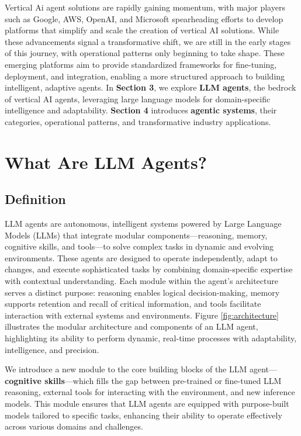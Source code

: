 \documentclass[12pt]{article}
\begin{document}
Vertical Ai agent solutions are rapidly gaining momentum, with major players such as Google, AWS, OpenAI, and Microsoft spearheading efforts to develop platforms that simplify and scale the creation of vertical AI solutions. While these advancements signal a transformative shift, we are still in the early stages of this journey, with operational patterns only beginning to take shape. These emerging platforms aim to provide standardized frameworks for fine-tuning, deployment, and integration, enabling a more structured approach to building intelligent, adaptive agents. In \textbf{Section 3}, we explore \textbf{LLM agents}, the bedrock of vertical AI agents, leveraging large language models for domain-specific intelligence and adaptability. \textbf{Section 4} introduces \textbf{agentic systems}, their categories, operational patterns, and transformative industry applications.


\section{What Are LLM Agents?}
\subsection{Definition}
LLM agents are autonomous, intelligent systems powered by Large Language Models (LLMs) that integrate modular components—reasoning, memory, cognitive skills, and tools—to solve complex tasks in dynamic and evolving environments. These agents are designed to operate independently, adapt to changes, and execute sophisticated tasks by combining domain-specific expertise with contextual understanding. 
Each module within the agent's architecture serves a distinct purpose: reasoning enables logical decision-making, memory supports retention and recall of critical information, and tools facilitate interaction with external systems and environments. Figure \ref{fig:architecture} illustrates the modular architecture and components of an LLM agent, highlighting its ability to perform dynamic, real-time processes with adaptability, intelligence, and precision.

We introduce a new module to the core building blocks of the LLM agent—\textbf{cognitive skills}—which fills the gap between pre-trained or fine-tuned LLM reasoning, external tools for interacting with the environment, and new inference models. This module ensures that LLM agents are equipped with purpose-built models tailored to specific tasks, enhancing their ability to operate effectively across various domains and challenges.
\end{document}
